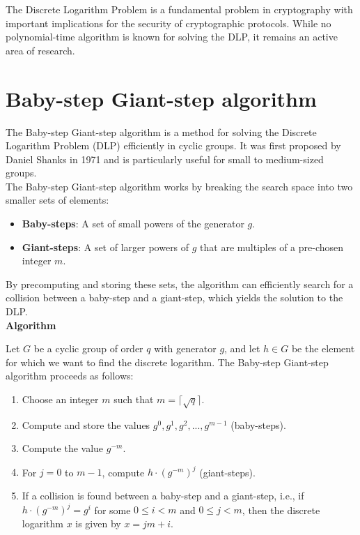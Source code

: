 \documentclass[11pt]{article}
\begin{document}
The Discrete Logarithm Problem is a fundamental problem in cryptography with important implications for the security of cryptographic protocols. While no polynomial-time algorithm is known for solving the DLP, it remains an active area of research.

\section{Baby-step Giant-step algorithm}

The Baby-step Giant-step algorithm is a method for solving the Discrete Logarithm Problem (DLP) efficiently in cyclic groups. It was first proposed by Daniel Shanks in 1971 and is particularly useful for small to medium-sized groups.
\\

The Baby-step Giant-step algorithm works by breaking the search space into two smaller sets of elements:

\begin{itemize}
    \item \textbf{Baby-steps}: A set of small powers of the generator $g$.
    \item \textbf{Giant-steps}: A set of larger powers of $g$ that are multiples of a pre-chosen integer $m$.
\end{itemize}

By precomputing and storing these sets, the algorithm can efficiently search for a collision between a baby-step and a giant-step, which yields the solution to the DLP.
\\

\textbf{Algorithm}

Let $G$ be a cyclic group of order $q$ with generator $g$, and let $h \in G$ be the element for which we want to find the discrete logarithm. The Baby-step Giant-step algorithm proceeds as follows:

\begin{enumerate}
    \item Choose an integer $m$ such that $m = \lceil \sqrt{q} \rceil$.
    \item Compute and store the values $g^0, g^1, g^2, ..., g^{m-1}$ (baby-steps).
    \item Compute the value $g^{-m}$.
    \item For $j = 0$ to $m-1$, compute $h \cdot (g^{-m})^j$ (giant-steps).
    \item If a collision is found between a baby-step and a giant-step, i.e., if $h \cdot (g^{-m})^j = g^i$ for some $0 \leq i < m$ and $0 \leq j < m$, then the discrete logarithm $x$ is given by $x = jm + i$.
\end{enumerate}
\\
\end{document}

